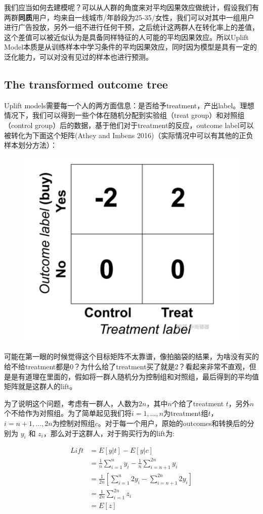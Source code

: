 \documentclass[12pt]{article}
\begin{document}
我们应当如何去建模呢？可以从人群的角度来对平均因果效应做统计，假设我们有两群\textbf{同质}用户，均来自一线城市/年龄段为25-35/女性，我们可以对其中一组用户进行广告投放，另外一组不进行任何干预，之后统计这两群人在转化率上的差值，这个差值可以被近似认为是具备同样特征的人可能的平均因果效应。所以Uplift Model本质是从训练样本中学习条件的平均因果效应，同时因为模型是具有一定的泛化能力，可以对没有见过的样本也进行预测。


\subsection{The transformed outcome tree}
Uplift models需要每一个人的两方面信息：是否给予treatment，产出label。理想情况下，我们可以得到一些个体在随机分配到实验组（treat group）和对照组（control group）后的数据，基于他们对于treatment的反应，outcome label可以被转化为下面这个矩阵(Athey and Imbens 2016)（实际情况中可以有其他的正负样本划分方法）：
\begin{figure}[H]
    \centering
    \includegraphics[width=.5\textwidth]{fig/CasualInference-Uplift-Model-Label.png}
\end{figure}

可能在第一眼的时候觉得这个目标矩阵不太靠谱，像拍脑袋的结果，为啥没有买的给不给treatment都是0？为什么给了treatment买了就是2？看起来非常不直观，但是是有道理在里面的，假如将一群人随机分为控制组和对照组，最后得到的平均值矩阵就是这群人的lift。

为了说明这个问题，考虑有一群人，人数为$2n$，其中$n$个给了treatment $t$，另外$n$个不给作为对照组。为了简单起见我们将$i =1 ,…, n$为treatment组$t$，$i =n+1 ,…, 2n$为控制对照组$c$。对于每一个用户，原始的outcomes和转换后的分别为 $y_i$ 和 $z_i$，那么对于这群人，对于购买行为的lift为:

\begin{align*}
Lift & = E[y|t] - E[y|c] \\
      & = \frac{1}{n}\sum_{i=1}^ny_i - \frac{1}{n}\sum_{i=n+1}^{2n}y_i \\
      & = \frac{1}{2n}[\sum_{i=1}^n2y_i - \sum_{i=n+1}^{2n}2y_i]  \\
      & = \frac{1}{2n}\sum_{i=1}^{2n}z_i \\
      & = E[z]
\end{align*}
\end{document}
